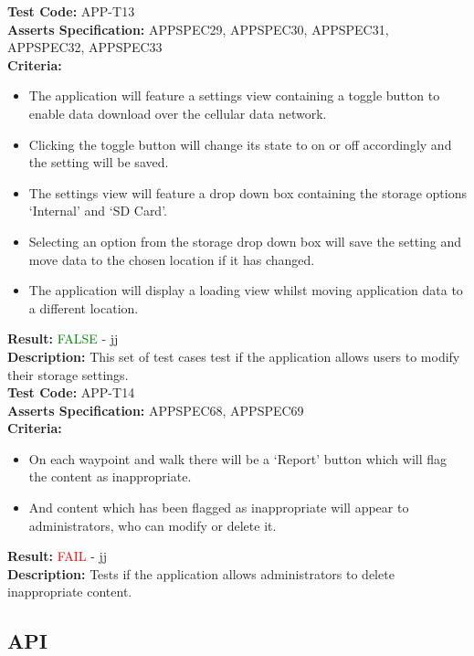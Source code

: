 \documentclass[11pt,a4paper]{report}
\begin{document}
\label{test:APP-T13}
\noindent\textbf{Test Code:} APP-T13\\
\textbf{Asserts Specification:} APPSPEC29, APPSPEC30, APPSPEC31, APPSPEC32, APPSPEC33\\ 
\textbf{Criteria:} \begin{itemize}
                     \item The application will feature a settings view containing a toggle button to enable data download over the cellular data network.
                     \item Clicking the toggle button will change its state to on or off accordingly and the setting will be saved.
                     \item The settings view will feature a drop down box containing the storage options `Internal' and `SD Card'.
                     \item Selecting an option from the storage drop down box will save the setting and move data to the chosen location if it has changed.
                     \item The application will display a loading view whilst moving application data to a different location.
                   \end{itemize}
\textbf{Result:} \textcolor{green}{FALSE} - jj\\
\textbf{Description:} This set of test cases test if the application allows users to modify their storage settings.\\

\label{test:APP-T14}
\noindent\textbf{Test Code:} APP-T14\\
\textbf{Asserts Specification:} APPSPEC68, APPSPEC69\\ 
\textbf{Criteria:} \begin{itemize}
                     \item On each waypoint and walk there will be a `Report' button which will flag the content as inappropriate.
                     \item And content which has been flagged as inappropriate will appear to administrators, who can modify or delete it.
                   \end{itemize}
\textbf{Result:} \textcolor{red}{FAIL} - jj\\
\textbf{Description:} Tests if the application allows administrators to delete inappropriate content.\\
\subsection{API}
\end{document}
